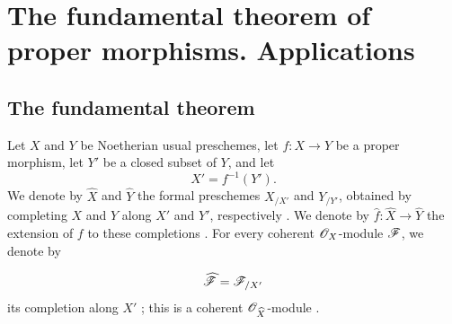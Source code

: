 \section{The fundamental theorem of proper morphisms. Applications}
\label{section:III.4}


\subsection{The fundamental theorem}
\label{subsection:III.4.1}

\begin{env}[4.1.1]
\label{III.4.1.1}
Let $X$ and $Y$ be Noetherian usual preschemes, let $f:X\to Y$ be a
proper morphism, let $Y'$ be a closed subset of $Y$, and let
\[
  X'=f^{-1}(Y').
\]
We denote by $\widehat{X}$ and $\widehat{Y}$ the formal preschemes
$X_{/X'}$ and $Y_{/Y'}$, obtained by completing $X$ and $Y$ along
$X'$ and $Y'$, respectively .
We denote by $\widehat{f}:\widehat{X}\to\widehat{Y}$ the extension of
$f$ to these completions .
For every coherent $\mathscr{O}_X$-module $\mathscr{F}$, we denote by


\[
  \widehat{\mathscr{F}}=\mathscr{F}_{/X'}
\]
its completion along $X'$ ; this is a coherent
$\mathscr{O}_{\widehat{X}}$-module .
\end{env}

